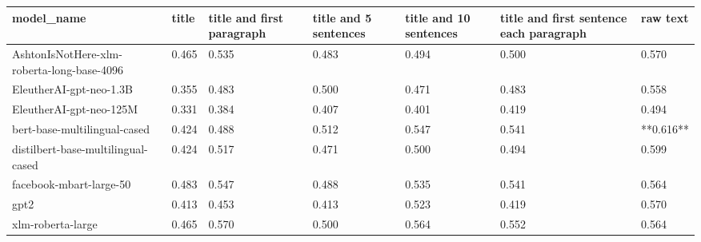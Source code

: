 \begin{tabular}{lllllll}
\toprule
                                model\_name & title & title and first paragraph & title and 5 sentences & title and 10 sentences & title and first sentence each paragraph &  raw text \\
\midrule
AshtonIsNotHere-xlm-roberta-long-base-4096 & 0.465 &                     0.535 &                 0.483 &                  0.494 &                                   0.500 &     0.570 \\
                   EleutherAI-gpt-neo-1.3B & 0.355 &                     0.483 &                 0.500 &                  0.471 &                                   0.483 &     0.558 \\
                   EleutherAI-gpt-neo-125M & 0.331 &                     0.384 &                 0.407 &                  0.401 &                                   0.419 &     0.494 \\
              bert-base-multilingual-cased & 0.424 &                     0.488 &                 0.512 &                  0.547 &                                   0.541 & **0.616** \\
        distilbert-base-multilingual-cased & 0.424 &                     0.517 &                 0.471 &                  0.500 &                                   0.494 &     0.599 \\
                   facebook-mbart-large-50 & 0.483 &                     0.547 &                 0.488 &                  0.535 &                                   0.541 &     0.564 \\
                                      gpt2 & 0.413 &                     0.453 &                 0.413 &                  0.523 &                                   0.419 &     0.570 \\
                         xlm-roberta-large & 0.465 &                     0.570 &                 0.500 &                  0.564 &                                   0.552 &     0.564 \\
\bottomrule
\end{tabular}
